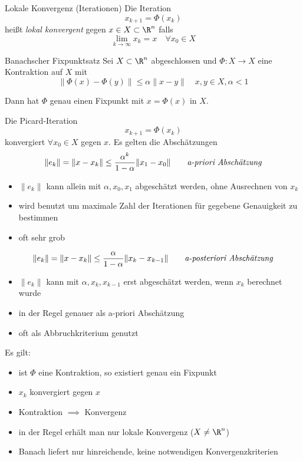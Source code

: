 \begin{defi}{Lokale Konvergenz (Iterationen)}
    Die Iteration
    \[
        x_{k+1} = \Phi(x_k)
    \]
    heißt \emph{lokal konvergent} gegen $x \in X \subset \R^n$ falls
    \[
        \lim_{k \to \infty} x_k = x \quad \forall x_0 \in X
    \]
\end{defi}

\begin{defi}{Banachscher Fixpunktsatz}
    Sei $X \subset \R^n$ abgeschlossen und $\Phi: X \to X$ eine Kontraktion auf $X$ mit
    \[
        \|\Phi(x) - \Phi(y)\| \leq \alpha \|x-y\| \quad x, y \in X, \alpha < 1
    \]
    
    Dann hat $\Phi$ genau einen Fixpunkt mit $x = \Phi(x)$ in $X$.
    
    Die Picard-Iteration
    \[
        x_{k+1} = \Phi(x_k)
    \]
    konvergiert $\forall x_0 \in X$ gegen $x$.
    Es gelten die Abschätzungen
    \[
        \|e_k\| = \|x - x_k\| \leq \frac{\alpha^k}{1-\alpha} \|x_1 - x_0\| \qquad \text{\emph{a-priori Abschätzung}}
    \]
    \begin{itemize}
        \item $\|e_k\|$ kann allein mit $\alpha, x_0, x_1$ abgeschätzt werden, ohne Ausrechnen von $x_k$
        \item wird benutzt um maximale Zahl der Iterationen für gegebene Genauigkeit zu bestimmen
        \item oft sehr grob
    \end{itemize}
    
    \[
        \|e_k\| = \|x - x_k\| \leq \frac{\alpha}{1-\alpha} \|x_k - x_{k-1}\| \qquad \text{\emph{a-posteriori Abschätzung}}
    \]
    \begin{itemize}
        \item $\|e_k\|$ kann mit $\alpha, x_k, x_{k-1}$ erst abgeschätzt werden, wenn $x_k$ berechnet wurde
        \item in der Regel genauer als a-priori Abschätzung
        \item oft als Abbruchkriterium genutzt
    \end{itemize}
    
    Es gilt:
    \begin{itemize}
        \item ist $\Phi$ eine Kontraktion, so existiert genau ein Fixpunkt
        \item $x_k$ konvergiert gegen $x$
        \item Kontraktion $\implies$ Konvergenz
        \item in der Regel erhält man nur lokale Konvergenz ($X \neq \R^n$)
        \item Banach liefert nur hinreichende, keine notwendigen Konvergenzkriterien
    \end{itemize}
\end{defi}



